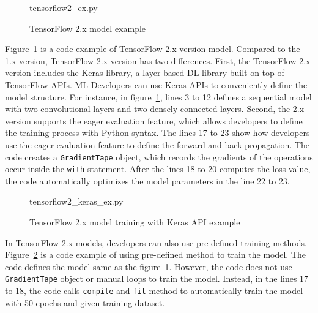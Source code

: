 \begin{figure}[ht!]

{tensorflow2_ex.py}
  \caption{TensorFlow 2.x model example}
\label{fig:back:tf2}
\end{figure}

Figure~\ref{fig:back:tf2} is a code example of TensorFlow 2.x version model.
Compared to the 1.x version, TensorFlow 2.x version has two differences.
First, the TensorFlow 2.x version includes the Keras library, a layer-based
DL library built on top of TensorFlow APIs.
ML Developers can use Keras APIs to conveniently define the model structure.
For instance, in figure~\ref{fig:back:tf2},
lines 3 to 12 defines a sequential model with two convolutional layers and
two densely-connected layers.
Second, the 2.x version supports the eager evaluation feature, which allows
developers to define the training process with Python syntax.
The lines 17 to 23 show how developers use the eager evaluation feature
to define the forward and back propagation. 
The code creates a {\tt GradientTape} object, which records the gradients
of the operations occur inside the {\tt with} statement.
After the lines 18 to 20 computes the loss value,
the code automatically optimizes the model parameters in the line 22 to 23.

\begin{figure}[ht!]

{tensorflow2_keras_ex.py}
  \caption{TensorFlow 2.x model training with Keras API example}
\label{fig:back:tf2_keras}
\end{figure}

In TensorFlow 2.x models, developers can also use pre-defined training
methods. Figure~\ref{fig:back:tf2_keras} is a code example of using
pre-defined method to train the model.
The code defines the model same as the figure~\ref{fig:back:tf2}.
However, the code does not use {\tt GradientTape} object or manual loops to
train the model.
Instead, in the lines 17 to 18, the code calls {\tt compile} and {\tt fit}
method to automatically train the model with 50 epochs and given training
dataset.

